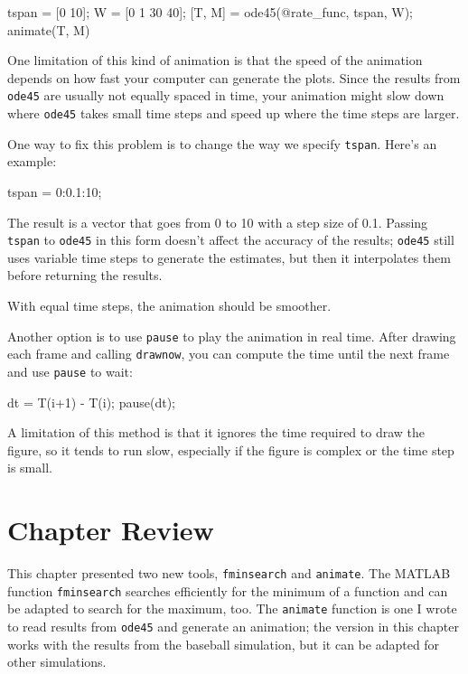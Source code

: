\begin{code}
    tspan = [0 10];
    W = [0 1 30 40];
    [T, M] = ode45(@rate_func, tspan, W);
    animate(T, M)
\end{code}

One limitation of this kind of animation is that the speed
of the animation depends on how fast your computer can generate
the plots.  Since the results from \lstinline{ode45} are usually not
equally spaced in time, your animation might slow down where
\lstinline{ode45} takes small time steps and speed up where the time
steps are larger.


One way to fix this problem is to change the way we specify \lstinline{tspan}.
Here's an example:

\begin{code}
    tspan = 0:0.1:10;
\end{code}

The result is a vector that goes from 0 to 10 with a step size of 0.1.
Passing \lstinline{tspan} to \lstinline{ode45} in this form doesn't affect the accuracy of the results;
\lstinline{ode45} still uses variable time steps to generate the estimates, but then it interpolates them before returning the results.


With equal time steps, the animation should be smoother.

Another option is to use \lstinline{pause} to play the animation in
real time.  After drawing each frame and calling
\lstinline{drawnow}, you can compute the time
until the next frame and use \lstinline{pause} to wait:

\begin{code}
    dt = T(i+1) - T(i);
    pause(dt);
\end{code}

A limitation of this method is that it ignores the time required to
draw the figure, so it tends to run slow, especially if the figure is
complex or the time step is small.

\section{Chapter Review}

This chapter presented two new tools, \lstinline{fminsearch} and \lstinline{animate}.
The MATLAB function \lstinline{fminsearch} searches efficiently for the minimum of a function and can be adapted to search for the maximum, too.
The \lstinline{animate} function is one I wrote to read results from \lstinline{ode45} and generate an animation; the version in this chapter works with the results from the baseball simulation, but it can be adapted for other simulations.

